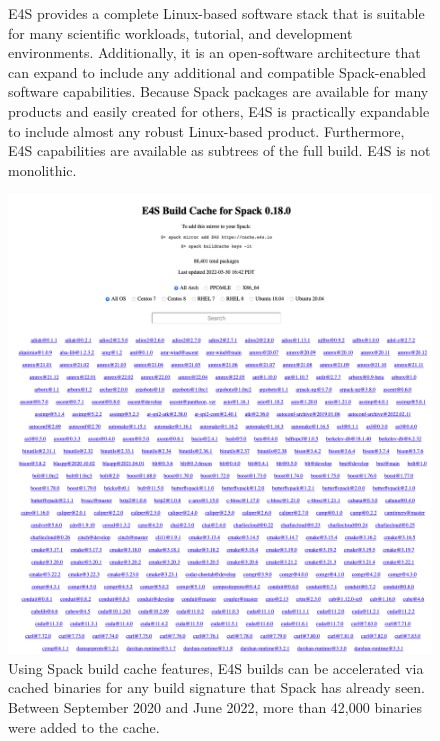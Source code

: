 \begin{figure}
	\centering
	\caption{E4S provides a complete Linux-based software stack that is suitable for many scientific workloads, tutorial, and development environments.  Additionally, it is an open-software architecture that can expand to include any additional and compatible Spack-enabled software capabilities. Because Spack packages are available for many products and easily created for others, E4S is practically expandable to include almost any robust Linux-based product.  Furthermore, E4S capabilities are available as subtrees of the full build. E4S is not monolithic.}
    \protect{}
	\label{fig:e4s-is-isnot}
\end{figure}

\begin{figure}
	\centering
	\includegraphics[width=0.9\linewidth]{projects/2.3.5-Ecosystem/2.3.5.01-Ecosystem-SDK/E4S_buildcache_Jun22}
	\caption{Using Spack build cache features, E4S builds can be accelerated via cached binaries for any build signature that Spack has already seen. Between September 2020 and June 2022, more than 42,000 binaries were added to the cache.}
	\label{fig:e4s-build-cache}
\end{figure}

